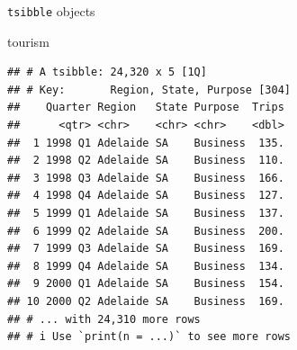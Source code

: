 \documentclass[14pt,ignorenonframetext,aspectratio=169]{beamer}
\newenvironment{Shaded}{\begin{snugshade}}{\end{snugshade}}
\newcommand{\NormalTok}[1]{#1}
\renewenvironment{Shaded}{\color{black}\begin{snugshade}\color{black}}{\end{snugshade}}
\renewenvironment{Shaded}{\color{black}\fontsize{10}{10}\sf\begin{snugshade}\color{black}}{\end{snugshade}}
\begin{document}
\begin{frame}[fragile]{\texttt{tsibble} objects}
\protect\hypertarget{tsibble-objects-1}{}
\fontsize{10}{11.3}\sf

\begin{Shaded}
\begin{Highlighting}[]
\NormalTok{tourism}
\end{Highlighting}
\end{Shaded}

\begin{verbatim}
## # A tsibble: 24,320 x 5 [1Q]
## # Key:       Region, State, Purpose [304]
##    Quarter Region   State Purpose  Trips
##      <qtr> <chr>    <chr> <chr>    <dbl>
##  1 1998 Q1 Adelaide SA    Business  135.
##  2 1998 Q2 Adelaide SA    Business  110.
##  3 1998 Q3 Adelaide SA    Business  166.
##  4 1998 Q4 Adelaide SA    Business  127.
##  5 1999 Q1 Adelaide SA    Business  137.
##  6 1999 Q2 Adelaide SA    Business  200.
##  7 1999 Q3 Adelaide SA    Business  169.
##  8 1999 Q4 Adelaide SA    Business  134.
##  9 2000 Q1 Adelaide SA    Business  154.
## 10 2000 Q2 Adelaide SA    Business  169.
## # ... with 24,310 more rows
## # i Use `print(n = ...)` to see more rows
\end{verbatim}


\end{frame}
\end{document}
